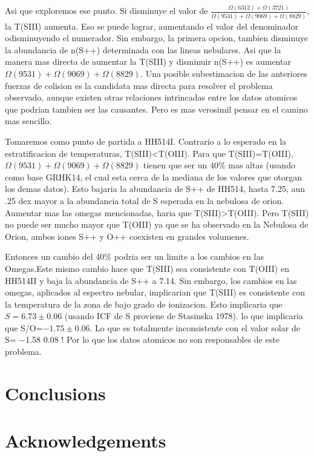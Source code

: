 \documentclass[fleqn,usenatbib]{mnras}
\begin{document}
Asi que exploremos ese punto. Si disminuye el valor de $\frac{\Omega(6312)+\Omega(3721)}{\Omega(9531)+\Omega(9069)+\Omega(8829)}$, la T(SIII) aumenta. Eso se puede lograr, aumentando el valor del denominador odisminuyendo el numerador. Sin embargo, la primera opcion, tambien disminuye la abundancia de n(S++) determinada con las lineas nebulares. Asi que la manera mas directa de aumentar la T(SIII) y disminuir n(S++) es aumentar $\Omega(9531)+\Omega(9069)+\Omega(8829)$. Una posible subestimacion de las anteriores fuerzas de colision es la candidata mas directa para resolver el problema observado, aunque existen otras relaciones intrincadas entre los datos atomicos que podrian tambien ser las causantes. Pero es mas verosimil pensar en el camino mas sencillo.


Tomaremos como punto de partida a HH514I. Contrario a lo esperado en la estratificacion de temperaturas, T(SIII)<T(OIII). Para que T(SIII)=T(OIII), $\Omega(9531)+\Omega(9069)+\Omega(8829)$  tienen que ser un 40\% mas altas (usando como base GRHK14, el cual esta cerca de la mediana de los valores que otorgan los demas datos). Esto bajaria la abundancia de S++ de HH514, hasta 7.25, aun .25 dex mayor a la abundancia total de S esperada en la nebulosa de orion. Aumentar mas las omegas mencionadas, haria que T(SIII)>T(OIII). Pero T(SIII) no puede ser mucho mayor que T(OIII) ya que se ha observado en la Nebulosa de Orion, ambos iones S++ y O++ coexisten en grandes volumenes.

Entonces un cambio del 40\% podria ser un limite a los cambios en las Omegas.Este mismo cambio hace que T(SIII) sea consistente con T(OIII) en HH514II y baja la abundancia de S++ a 7.14. Sin embargo, los cambios en las omegas, aplicados al espectro nebular, implicarian que T(SIII) es consistente con la temperatura de la zona de bajo grado de ionizacion. Esto implicaria que $S=6.73 \pm 0.06$ (usando ICF de S proviene de Stasinska 1978). lo que implicaria que S/O=$-1.75 \pm 0.06$. Lo que es totalmente inconsistente con el valor solar de S= −1.58  0.08 ! Por lo que los datos atomicos no son responsables de este problema.






\section{Conclusions}

\section*{Acknowledgements}
\end{document}
